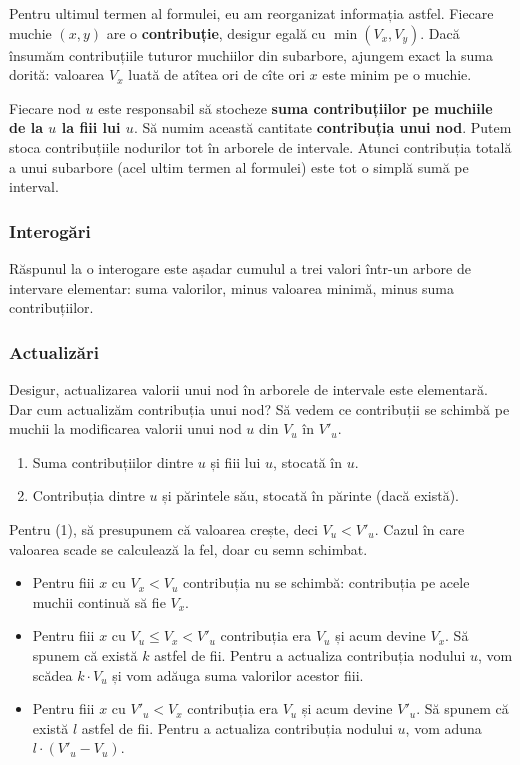 \documentclass[../main.tex]{subfiles}
\begin{document}
Pentru ultimul termen al formulei, eu am reorganizat informația astfel. Fiecare muchie $(x,y)$ are o \textbf{contribuție}, desigur egală cu $\min(V_x, V_y)$. Dacă însumăm contribuțiile tuturor muchiilor din subarbore, ajungem exact la suma dorită: valoarea $V_x$ luată de atîtea ori de cîte ori $x$ este minim pe o muchie.

Fiecare nod $u$ este responsabil să stocheze \textbf{suma contribuțiilor pe muchiile de la $u$ la fiii lui $u$}. Să numim această cantitate \textbf{contribuția unui nod}. Putem stoca contribuțiile nodurilor tot în arborele de intervale. Atunci contribuția totală a unui subarbore (acel ultim termen al formulei) este tot o simplă sumă pe interval.

\subsubsection*{Interogări}

Răspunul la o interogare este așadar cumulul a trei valori într-un arbore de intervare elementar: suma valorilor, minus valoarea minimă, minus suma contribuțiilor.

\subsubsection*{Actualizări}

Desigur, actualizarea valorii unui nod în arborele de intervale este elementară. Dar cum actualizăm contribuția unui nod? Să vedem ce contribuții se schimbă pe muchii la modificarea valorii unui nod $u$ din $V_u$ în $V'_u$.

\begin{enumerate}
  \item Suma contribuțiilor dintre $u$ și fiii lui $u$, stocată în $u$.
  \item Contribuția dintre $u$ și părintele său, stocată în părinte (dacă există).
\end{enumerate}

Pentru (1), să presupunem că valoarea crește, deci $V_u < V'_u$. Cazul în care valoarea scade se calculează la fel, doar cu semn schimbat.

\begin{itemize}
  \item Pentru fiii $x$ cu $V_x < V_u$ contribuția nu se schimbă: contribuția pe acele muchii continuă să fie $V_x$.

  \item Pentru fiii $x$ cu $V_u \leq V_x < V'_u$ contribuția era $V_u$ și acum devine $V_x$. Să spunem că există $k$ astfel de fii. Pentru a actualiza contribuția nodului $u$, vom scădea $k \cdot V_u$ și vom adăuga suma valorilor acestor fiii.

  \item Pentru fiii $x$ cu $V'_u < V_x$ contribuția era $V_u$ și acum devine $V'_u$. Să spunem că există $l$ astfel de fii. Pentru a actualiza contribuția nodului $u$, vom aduna $l \cdot (V'_u - V_u)$.
\end{itemize}
\end{document}
